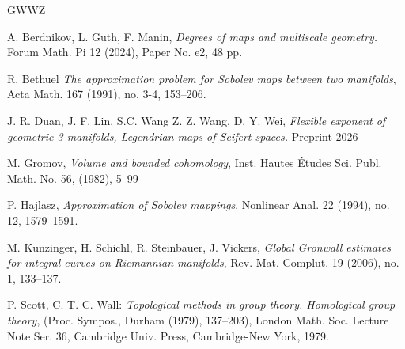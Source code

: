 \documentclass{amsart}
\begin{document}
\begin{thebibliography}{GWWZ}

 A. Berdnikov, L. Guth, F. Manin, 
{\it Degrees of maps and multiscale geometry.}
Forum Math. Pi 12 (2024), Paper No. e2, 48 pp.

 R. Bethuel {\it The approximation problem for Sobolev maps between two manifolds},
Acta Math. 167 (1991), no. 3-4, 153--206.

 J. R. Duan, J. F. Lin,  S.C. Wang Z. Z. Wang,  D. Y. Wei,  {\it Flexible exponent of geometric 3-manifolds,  Legendrian maps of Seifert spaces.} Preprint 2026

 M. Gromov, {\it Volume and bounded cohomology},  Inst. Hautes \'{E}tudes Sci. Publ. Math. No. 56, (1982), 5--99

 P. Hajlasz, {\it Approximation of Sobolev mappings}, 
Nonlinear Anal. 22 (1994), no. 12, 1579--1591.




 M. Kunzinger, H. Schichl, R. Steinbauer, J. Vickers, {\it Global Gronwall estimates for integral curves on Riemannian manifolds}, Rev. Mat. Complut. 19 (2006), no. 1, 133--137.









 P. Scott, C. T. C. Wall: {\it Topological methods in group theory.
Homological group theory}, (Proc. Sympos., Durham (1979), 137--203),
London Math. Soc. Lecture Note Ser. 36, Cambridge Univ. Press,
Cambridge-New York, 1979.


\end{thebibliography}
\end{document}
